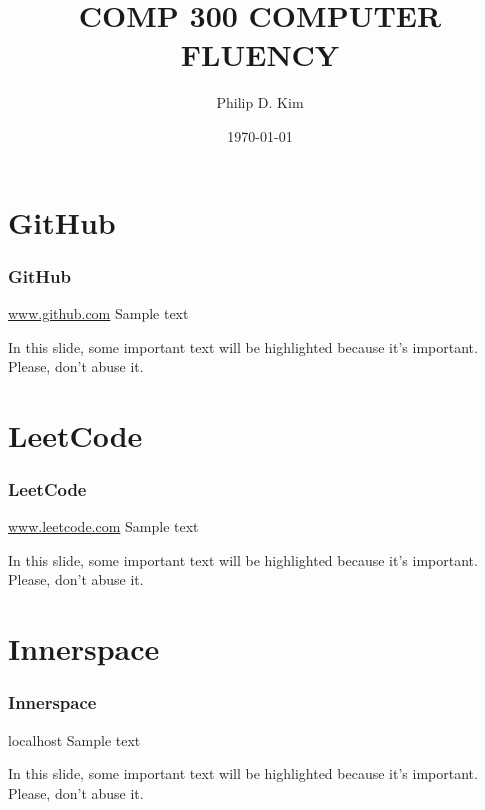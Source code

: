 \documentclass{beamer}
\title{COMP 300 COMPUTER FLUENCY}
\author{Philip D. Kim}
\institute[CSUN]{California State University Northridge}
\date{\today}
\begin{document}
\frame{\titlepage}

\section{GitHub}
\begin{frame}
  \frametitle{GitHub}
  \begin{block}{\href{www.github.com}{www.github.com}}
    Sample text
  \end{block}
  In this slide, some important text will be
  \alert{highlighted} because it's important.
  Please, don't abuse it.
\end{frame}

\section{LeetCode}
\begin{frame}
  \frametitle{LeetCode}
  \begin{block}{\href{www.leetcode.com}{www.leetcode.com}}
    Sample text
  \end{block}
  In this slide, some important text will be
  \alert{highlighted} because it's important.
  Please, don't abuse it.
\end{frame}

\section{Innerspace}
\begin{frame}
  \frametitle{Innerspace}
  \begin{block}{localhost}
    Sample text
  \end{block}
  In this slide, some important text will be
  \alert{highlighted} because it's important.
  Please, don't abuse it.
\end{frame}
\end{document}
